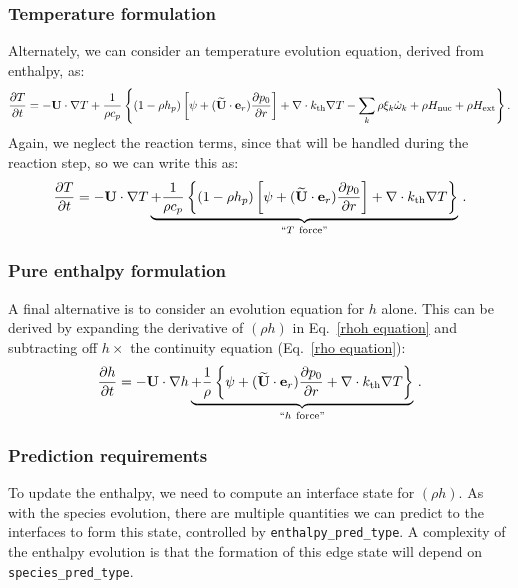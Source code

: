 \subsubsection{Temperature formulation}

Alternately, we can consider an temperature evolution equation, derived
from enthalpy, as:
\begin{equation}
\frac{\partial T}{\partial t} = -{\bf U}\cdot\nabla T
+ \frac{1}{\rho c_p}\left\{(1-\rho h_p)\left[\psi
+ (\widetilde{{\bf U}} \cdot \mathbf{e}_r )\frac{\partial p_0}{\partial r}\right] 
+ \nabla \cdot k_{\rm th} \nabla T
- \sum_k\rho\xi_k\dot{\omega}_k 
+ \rho H_{\rm nuc} + \rho H_{\rm ext}\right\}.
\end{equation}
Again, we neglect the reaction terms, since that will be handled during
the reaction step, so we can write this as:
\begin{equation}
\frac{\partial T}{\partial t} = -{\bf U}\cdot\nabla T
\underbrace{
+ \frac{1}{\rho c_p}\left\{(1-\rho h_p)\left[\psi
+ (\widetilde{{\bf U}} \cdot \mathbf{e}_r )\frac{\partial p_0}{\partial r}\right] 
+ \nabla \cdot k_{\rm th} \nabla T \right \} }_{``T~\text{force''}} \, .
\label{T equation labeled}
\end{equation}

\subsubsection{Pure enthalpy formulation}

A final alternative is to consider an evolution equation for $h$
alone.  This can be derived by expanding the derivative of $(\rho h)$
in Eq.~\ref{rhoh equation} and subtracting off $h \times$ the
continuity equation (Eq.~\ref{rho equation}):
\begin{equation}
\frac{\partial h}{\partial t} = -{\bf U} \cdot \nabla h 
\underbrace{+ \frac{1}{\rho}
\left \{ \psi + (\widetilde{{\bf U}} \cdot \mathbf{e}_r )\frac{\partial p_0}{\partial r}
+ \nabla \cdot k_{\rm th} \nabla T \right \} }_{``h~\text{force''}} \, .
\label{h equation labeled}
\end{equation}

\subsubsection{Prediction requirements}

To update the enthalpy, we need to compute an interface state for
$(\rho h)$.  As with the species evolution, there are multiple
quantities we can predict to the interfaces to form this state,
controlled by {\tt enthalpy\_pred\_type}.  A complexity of the
enthalpy evolution is that the formation of this edge state will
depend on {\tt species\_pred\_type}.  


